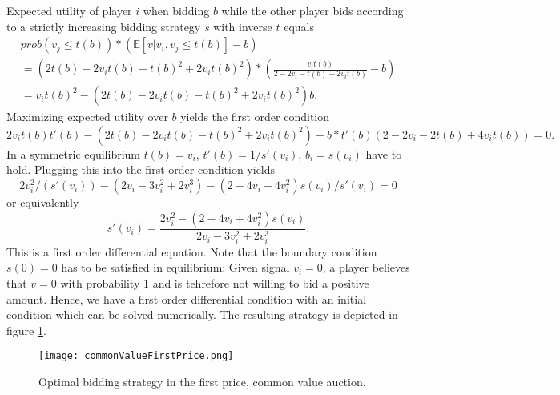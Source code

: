 \documentclass[a4paper,11pt]{article}
\begin{document}
Expected utility of player $i$ when bidding $b$ while the other player bids according to a strictly increasing bidding strategy $s$ with inverse $t$ equals
\begin{multline*}
prob(v_j\leq t(b))*(\mathbb{E}[v|v_i,v_j\leq t(b)]-b)\\=(2t(b)-2v_i t(b)-t(b)^2+2 v_it(b)^2)*\left(\frac{v_i t(b)}{2-2v_i-t(b)+2v_i t(b)}-b\right)\\=v_i t(b)^2-(2t(b)-2v_i t(b)-t(b)^2+2 v_it(b)^2)b.
\end{multline*}
Maximizing expected utility over $b$ yields the first order condition
\begin{equation*}
  2v_i t(b)t'(b)-(2t(b)-2v_i t(b)-t(b)^2+2 v_it(b)^2)-b*t'(b)(2-2v_i-2t(b)+4v_it(b))=0.
\end{equation*}
In a symmetric equilibrium $t(b)=v_i$, $t'(b)=1/s'(v_i)$, $b_i=s(v_i)$ have to hold. Plugging this into the first order condition yields
\begin{equation*}
 2v_i^2/(s'(v_i))-(2v_i-3v_i^2+2v_i^3)-(2-4v_i+4v_i^2)s(v_i)/s'(v_i) =0
\end{equation*}
or equivalently
\begin{equation}\label{eq:ComVal1stPSp}
  s'(v_i)=\frac{2v_i^2-(2-4v_i+4v_i^2)s(v_i)}{2v_i-3v_i^2+2v_i^3}.
\end{equation}
This is a first order differential equation. Note that the boundary condition $s(0)=0$ has to be satisfied in equilibrium: Given signal $v_i=0$, a player believes that $v=0$ with probability 1 and is tehrefore not willing to bid a positive amount. Hence, we have a first order differential condition with an initial condition which can be solved numerically. The resulting strategy is depicted in figure \ref{fig:1stPComVal}.

\begin{figure}[h]
  \centering
  \texttt{[image: commonValueFirstPrice.png]}
  \caption{Optimal bidding strategy in the first price, common value auction.}
  \label{fig:1stPComVal}
\end{figure}
\end{document}
